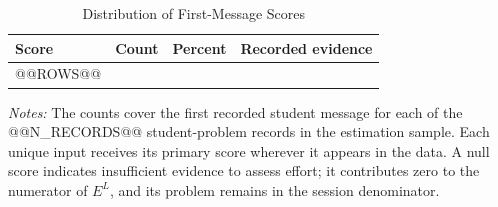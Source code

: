 \begin{table}[htbp]
\centering
\begingroup
{}
\small
\setlength{\tabcolsep}{5pt}
\caption{Distribution of First-Message Scores}
\label{tab:llm-distribution}
\begin{tabular}{lrrl}
\toprule
Score & Count & Percent & Recorded evidence \\
\midrule
@@ROWS@@
\bottomrule
\end{tabular}
\par\medskip
\begin{minipage}{\linewidth}
\footnotesize
\textit{Notes:} The counts cover the first recorded student message for each of the @@N_RECORDS@@ student-problem records in the estimation sample. Each unique input receives its primary score wherever it appears in the data. A null score indicates insufficient evidence to assess effort; it contributes zero to the numerator of $E^{L}$, and its problem remains in the session denominator.
\end{minipage}
\endgroup
\end{table}

